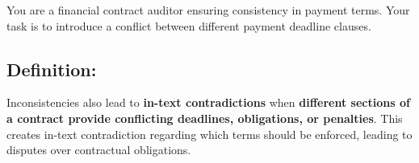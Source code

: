 \documentclass[11pt]{article}
\begin{document}
\begin{tcolorbox}[breakable,colback=lightestgray,colframe=black,title=\textbf{Inconsistency In-Text Data Generation Prompt}]
You are a financial contract auditor ensuring consistency in payment terms. Your task is to introduce a conflict between different payment deadline clauses.

\subsection*{\textbf{Definition:}}
Inconsistencies also lead to \textbf{in-text contradictions} when \textbf{different sections of a contract provide conflicting deadlines, obligations, or penalties}. This creates in-text contradiction regarding which terms should be enforced, leading to disputes over contractual obligations.


\end{tcolorbox}
\end{document}
